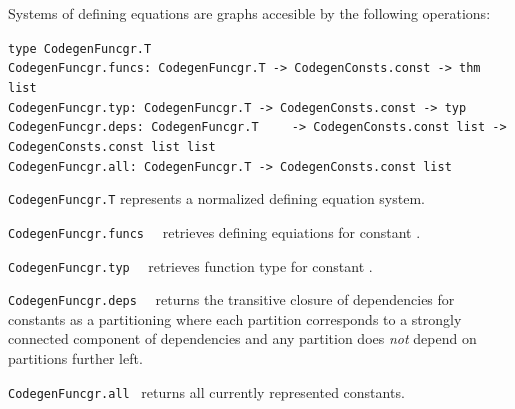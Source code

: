 \begin{isabellebody}
\begin{isamarkuptext}
\begin{description}
  \end{description}

  Systems of defining equations are graphs accesible by the
  following operations:%
\end{isamarkuptext}%
\isamarkuptrue%
%
\isadelimmlref
%
\endisadelimmlref
%
\isatagmlref
%
\begin{isamarkuptext}%
\begin{mldecls}
  \verb|type CodegenFuncgr.T| \\
  \verb|CodegenFuncgr.funcs: CodegenFuncgr.T -> CodegenConsts.const -> thm list| \\
  \verb|CodegenFuncgr.typ: CodegenFuncgr.T -> CodegenConsts.const -> typ| \\
  \verb|CodegenFuncgr.deps: CodegenFuncgr.T|\isasep\isanewline%
\verb|    -> CodegenConsts.const list -> CodegenConsts.const list list| \\
  \verb|CodegenFuncgr.all: CodegenFuncgr.T -> CodegenConsts.const list|
  \end{mldecls}

  \begin{description}

  \item \verb|CodegenFuncgr.T| represents
    a normalized defining equation system.

  \item \verb|CodegenFuncgr.funcs|~~
    retrieves defining equiations for constant .

  \item \verb|CodegenFuncgr.typ|~~
    retrieves function type for constant .

  \item \verb|CodegenFuncgr.deps|~~
    returns the transitive closure of dependencies for
    constants  as a partitioning where each partition
    corresponds to a strongly connected component of
    dependencies and any partition does \emph{not}
    depend on partitions further left.

  \item \verb|CodegenFuncgr.all|~
    returns all currently represented constants.


\end{description}
\end{isamarkuptext}
\end{isabellebody}
